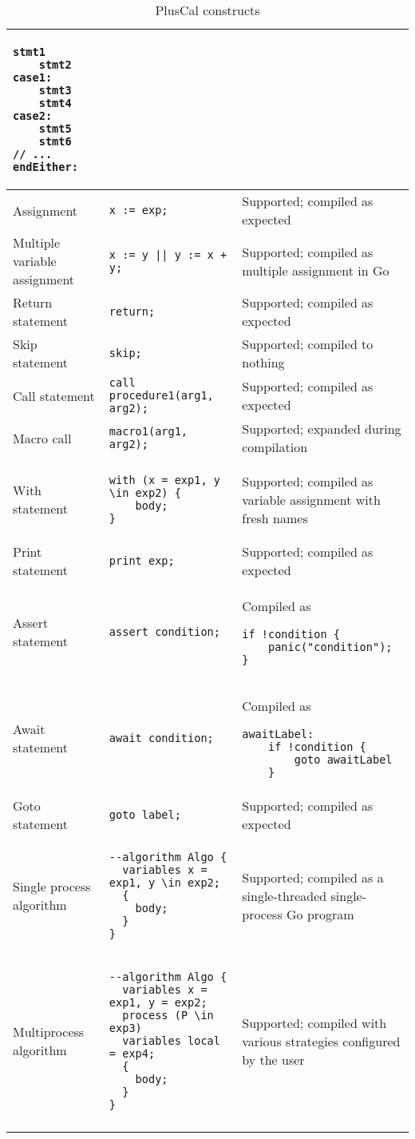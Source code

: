 \begin{center}
\begin{longtable}{ || m{} | m{} | m{} || }
\begin{lstlisting}[language=golang]
	stmt1
	stmt2
case1:
	stmt3
	stmt4
case2:
	stmt5
	stmt6
// ...
endEither:
	\end{lstlisting} \\
	\hline
	Assignment & \lstinline[language=pcal]|x := exp;| & Supported; compiled as expected \\
	\hline
	Multiple variable assignment & \lstinline[language=pcal]!x := y || y := x + y;! & Supported; compiled as multiple assignment in Go \\
	\hline
	Return statement & \lstinline[language=pcal]|return;| & Supported; compiled as expected \\
	\hline
	Skip statement & \lstinline[language=pcal]|skip;| & Supported; compiled to nothing \\
	\hline
	Call statement & \lstinline[language=pcal]|call procedure1(arg1, arg2);| & Supported; compiled as expected \\
	\hline
	Macro call & \lstinline[language=pcal]|macro1(arg1, arg2);| & Supported; expanded during compilation \\
	\hline
	With statement &
	\begin{lstlisting}[language=pcal]
with (x = exp1, y \in exp2) {
	body;
}
	\end{lstlisting} &
	Supported; compiled as variable assignment with fresh names \\
	\hline
	Print statement &
	\lstinline[language=pcal]|print exp;| & Supported; compiled as expected \\
	\hline
	Assert statement & \lstinline[language=pcal]|assert condition;| &
	Compiled as
	\begin{lstlisting}[language=golang]
if !condition {
	panic("condition");
}
	\end{lstlisting} \\
	\hline
	Await statement & \lstinline[language=pcal]|await condition;| &
	Compiled as
	\begin{lstlisting}[language=golang]
awaitLabel:
	if !condition {
		goto awaitLabel
	}
	\end{lstlisting} \\
	\hline
	Goto statement & \lstinline[language=pcal]|goto label;| & Supported; compiled as expected \\
	\hline
	Single process algorithm &
	\begin{lstlisting}[language=pcal]
--algorithm Algo {
  variables x = exp1, y \in exp2;
  {
  	body;
  }
}
	\end{lstlisting} &
	Supported; compiled as a single-threaded single-process Go program \\
	\hline
	Multiprocess algorithm &
	\begin{lstlisting}[language=pcal]
--algorithm Algo {
  variables x = exp1, y = exp2;
  process (P \in exp3)
  variables local = exp4;
  {
  	body;
  }
}
	\end{lstlisting} &
	Supported; compiled with various strategies configured by the user \\
	\hline
	\caption{PlusCal constructs}
	\label{table:pcal-constructs}
\end{longtable}
\end{center}

